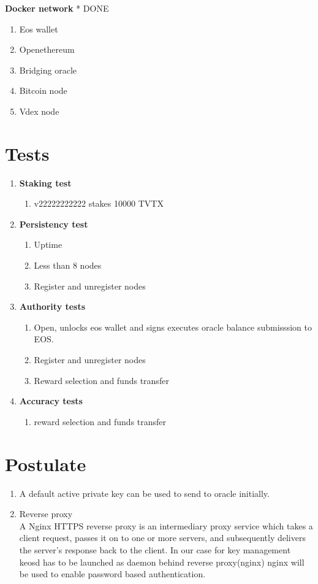 \documentclass[]{article}
\begin{document}
   \textbf{Docker network}	  * {\color{green} DONE}
  \begin{enumerate}
  	\item Eos wallet
  	\item Openethereum
  	\item Bridging oracle
  	\item Bitcoin node
  	\item Vdex node
  \end{enumerate}

\section{Tests}
					\begin{enumerate}
						\item \textbf{Staking test}
						\begin{enumerate}
							\item v22222222222 stakes 10000 TVTX
						\end{enumerate}
						\item \textbf{Persistency test}
							\begin{enumerate}
								\item Uptime\textit{}
								\item Less than 8 nodes 
								\item Register and unregister nodes
							\end{enumerate}
						\item \textbf{Authority tests}
							\begin{enumerate}
							\item Open, unlocks eos wallet and signs executes oracle balance submisssion to EOS.
							\item Register and unregister nodes
							\item Reward selection and funds transfer	
						\end{enumerate}
											\item \textbf{Accuracy tests}
													\begin{enumerate}
															\item reward selection and funds transfer	
													\end{enumerate}
				\end{enumerate}
\section{Postulate}
\begin{enumerate}
	\item A default active private key can be used to send to oracle initially.
	\item Reverse proxy \\
	A Nginx HTTPS reverse proxy is an intermediary proxy service which takes a client request, passes it on to one or more servers, and subsequently delivers the server's response back to the client. 
	In our case for key management keosd has to be launched as daemon behind reverse proxy(nginx)
	nginx will be used to enable password based authentication.
\end{enumerate}
\end{document}
